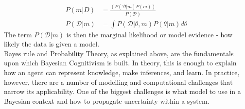 \documentclass[oneside, 11pt]{book}
\begin{document}
\begin{align}
P(m|D) &= \frac{(P(\mathcal{D}| m) P(m))}{P(\mathcal{D})}\\
P(\mathcal{D}|m) &= \int P(\mathcal{D}| \theta ,m) P(\theta |m) d \theta
\end{align}
The term $P(\mathcal{D}|m)$ is then the marginal likelihood or model evidence - how likely the data is given a model.\medskip\\

Bayes rule and Probability Theory, as explained above, are the fundamentals upon which Bayesian Cognitivism is built. In theory, this is enough to explain how an agent can represent knowledge, make inferences, and learn. In practice, however, there are a number of modelling and computational challenges that narrow its applicability. One of the biggest challenges is what model to use in a Bayesian context and how to propagate uncertainty within a system.
\end{document}

